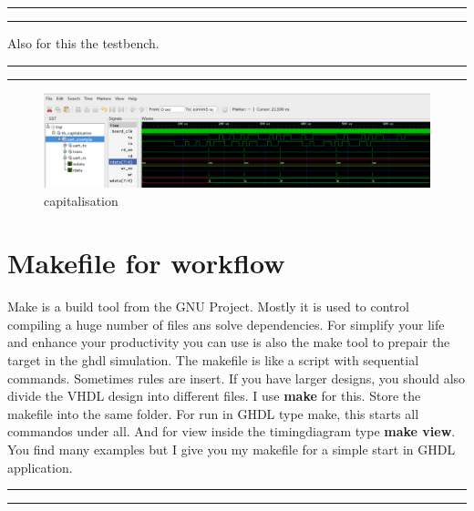 \documentclass[a4paper,11pt]{article}
\begin{document}
\hrule

\hrule
\vspace{10pt}
Also for this the testbench.
\\
\hrule

\hrule
\vspace{10pt}

\begin{figure}[H]
  \begin{center}
    \includegraphics[scale=0.4]{capitalisation/capitalisation.png}
    \caption{capitalisation}
    \label{fig:capitalisation}
  \end{center}
\end{figure}

\section{Makefile for workflow}
Make is a build tool from the GNU Project. Mostly it is used to control compiling a huge number of files ans solve dependencies. For simplify your life and enhance your productivity you can use is also the make tool to prepair the target in the ghdl simulation. The makefile is like a script with sequential commands. Sometimes rules are insert. If you have larger designs, you should also divide the VHDL design into different files. I use \textbf{make} for this. Store the makefile into the same folder. For run in GHDL type make, this starts all commandos under all. And for view inside the timingdiagram type \textbf{make view}. You find many examples but I give you my makefile for a simple start in GHDL application.
\\
\hrule
{}
\hrule
\vspace{10pt}
\end{document}
